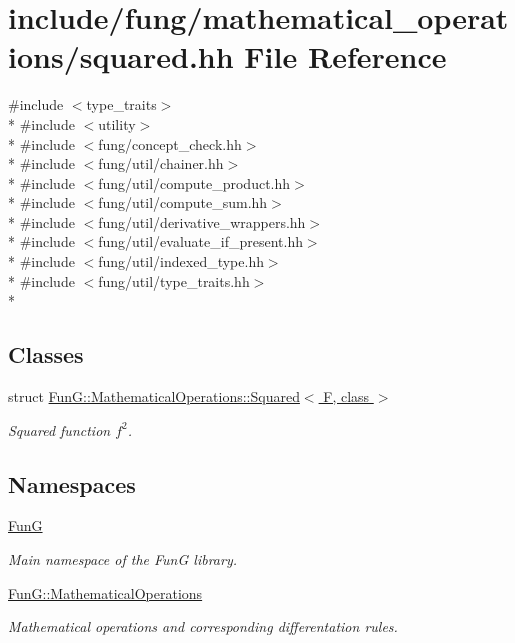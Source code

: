 \hypertarget{squared_8hh}{\section{include/fung/mathematical\-\_\-operations/squared.hh File Reference}
\label{squared_8hh}
}
{\ttfamily \#include $<$type\-\_\-traits$>$}\\*
{\ttfamily \#include $<$utility$>$}\\*
{\ttfamily \#include $<$fung/concept\-\_\-check.\-hh$>$}\\*
{\ttfamily \#include $<$fung/util/chainer.\-hh$>$}\\*
{\ttfamily \#include $<$fung/util/compute\-\_\-product.\-hh$>$}\\*
{\ttfamily \#include $<$fung/util/compute\-\_\-sum.\-hh$>$}\\*
{\ttfamily \#include $<$fung/util/derivative\-\_\-wrappers.\-hh$>$}\\*
{\ttfamily \#include $<$fung/util/evaluate\-\_\-if\-\_\-present.\-hh$>$}\\*
{\ttfamily \#include $<$fung/util/indexed\-\_\-type.\-hh$>$}\\*
{\ttfamily \#include $<$fung/util/type\-\_\-traits.\-hh$>$}\\*
\subsection*{Classes}
\begin{DoxyCompactItemize}
\item 
struct \hyperlink{structFunG_1_1MathematicalOperations_1_1Squared}{Fun\-G\-::\-Mathematical\-Operations\-::\-Squared$<$ F, class $>$}
\begin{DoxyCompactList}\small\item\em Squared function $f^2$. \end{DoxyCompactList}\end{DoxyCompactItemize}
\subsection*{Namespaces}
\begin{DoxyCompactItemize}
\item 
\hyperlink{namespaceFunG}{Fun\-G}
\begin{DoxyCompactList}\small\item\em Main namespace of the Fun\-G library. \end{DoxyCompactList}\item 
\hyperlink{namespaceFunG_1_1MathematicalOperations}{Fun\-G\-::\-Mathematical\-Operations}
\begin{DoxyCompactList}\small\item\em Mathematical operations and corresponding differentation rules. \end{DoxyCompactList}\end{DoxyCompactItemize}
